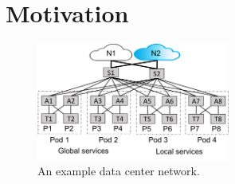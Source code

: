 \documentclass[numbers, 10pt, preprint]{sigplanconf}
\begin{document}





\section{Motivation}
\label{sec:motivation}


\begin{figure}[t!]
  \centering
  \includegraphics[width=2.5in]{figures/example}
  \caption{An example data center network.}
  \label{fig:example}
  \vspace{-1em}
\end{figure}
\end{document}
